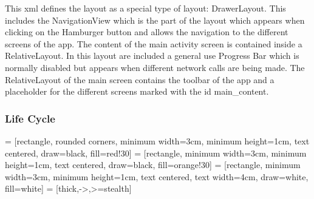 This xml defines the layout as a special type of layout: DrawerLayout. This includes the NavigationView which is the part of the layout which appears when clicking on the Hamburger button and allows the navigation to the different screens of the app. The content of the main activity screen is contained inside a RelativeLayout. In this layout are included a general use Progress Bar which is normally disabled but appears when different network calls are being made. The RelativeLayout of the main screen contains the toolbar of the app and a placeholder for the different screens marked with the id main\_content.

\subsubsection { Life Cycle }

 = [rectangle, rounded corners, minimum width=3cm, 
minimum height=1cm, text centered, draw=black, fill=red!30]
 = [rectangle, minimum width=3cm, minimum height=1cm, text centered, draw=black, fill=orange!30]
 = [rectangle, minimum width=3cm, minimum height=1cm, text centered,
text width=4cm, draw=white, fill=white]
 = [thick,->,>=stealth]

